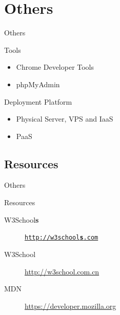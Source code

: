 \documentclass{beamer}
\begin{document}
\section{Others}

\begin{frame}{Others}
    \begin{block}{Tools}
        \begin{itemize}
            \item Chrome Developer Tools
            \item phpMyAdmin
        \end{itemize}
    \end{block}
    \pause
    \begin{block}{Deployment Platform}
        \begin{itemize}
            \item Physical Server, VPS and IaaS
            \item PaaS
        \end{itemize}
    \end{block}
\end{frame}

\subsection{Resources}

\begin{frame}{Others}
    \begin{block}{Resources}
        \begin{description}
            \item[W3School\bf s] \href{http://w3schools.com}{\tt http://w3school{\bf s}.com}
            \item[W3School] \url{http://w3school.com.cn}
            \item[MDN] \url{https://developer.mozilla.org}
        \end{description}
    \end{block}
\end{frame}
\end{document}
